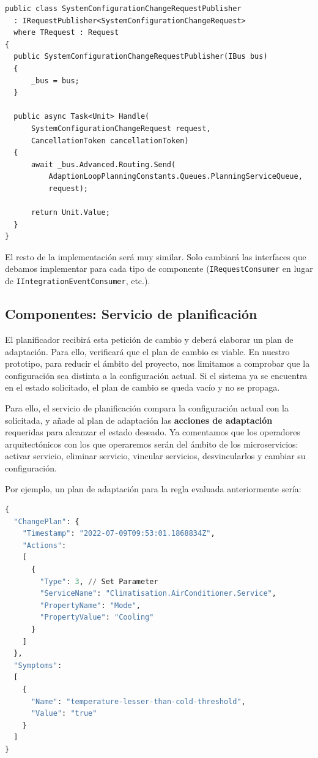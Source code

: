 \begin{lstlisting}[language={[Sharp]C},caption={Para suscribirnos a los \foreign{english}{topics} de las notificaciones obtenemos las dependencias de las reglas mediante reflexión},captionpos=b, label=ls:request-publisher]
public class SystemConfigurationChangeRequestPublisher
  : IRequestPublisher<SystemConfigurationChangeRequest>
  where TRequest : Request
{
  public SystemConfigurationChangeRequestPublisher(IBus bus)
  {
      _bus = bus;
  }

  public async Task<Unit> Handle(
      SystemConfigurationChangeRequest request,
      CancellationToken cancellationToken)
  {
      await _bus.Advanced.Routing.Send(
          AdaptionLoopPlanningConstants.Queues.PlanningServiceQueue,
          request);

      return Unit.Value;
  }
}
  \end{lstlisting}

El resto de la implementación será muy similar. Solo cambiará las interfaces que debamos implementar para cada tipo de componente (\texttt{IRequestConsumer} en lugar de \texttt{IIntegrationEventConsumer}, etc.).

\subsection{Componentes: Servicio de planificación}

El planificador recibirá esta petición de cambio y deberá elaborar un plan de adaptación. Para ello, verificará que el plan de cambio es viable. En nuestro prototipo, para reducir el ámbito del proyecto, nos limitamos a comprobar que la configuración sea distinta a la configuración actual. Si el sistema ya se encuentra en el estado solicitado, el plan de cambio se queda vacío y no se propaga.

Para ello, el servicio de planificación compara la configuración actual con la solicitada, y añade al plan de adaptación las \textbf{acciones de adaptación} requeridas para alcanzar el estado deseado. Ya comentamos que los operadores arquitectónicos con los que operaremos serán del ámbito de los microservicios: activar servicio, eliminar servicio, vincular servicios, desvincularlos y cambiar su configuración.

Por ejemplo, un plan de adaptación para la regla evaluada anteriormente sería:

\begin{lstlisting}[language=python,caption={Plan de adaptación generado. Solo contiene una acción de adaptación: cambiar la configuración \texttt{Mode} del servicio \texttt{AirConditioner}.},captionpos=b, label=ls:adaption-change-plan]
{
  "ChangePlan": {
    "Timestamp": "2022-07-09T09:53:01.1868834Z",
    "Actions":
    [
      {
        "Type": 3, // Set Parameter
        "ServiceName": "Climatisation.AirConditioner.Service",
        "PropertyName": "Mode",
        "PropertyValue": "Cooling"
      }
    ]
  },
  "Symptoms":
  [
    {
      "Name": "temperature-lesser-than-cold-threshold",
      "Value": "true"
    }
  ]
}
\end{lstlisting}


